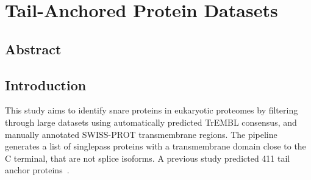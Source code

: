 \chapter{Tail-Anchored Protein Datasets}
\sloppy
\section{Abstract}

\section{Introduction}
This study aims to identify \gls{snare} proteins in eukaryotic proteomes by filtering through large datasets using automatically predicted TrEMBL consensus, and manually annotated SWISS-PROT transmembrane regions. The pipeline generates a list of singlepass proteins with a transmembrane domain close to the C terminal, that are not splice isoforms. A previous study predicted 411 tail anchor proteins~\cite{Kalbfleisch2007}.

